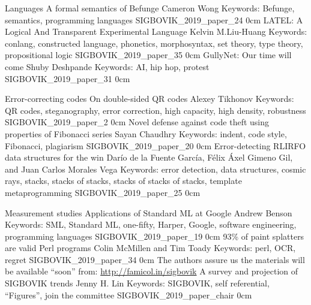 \addtrack
	{}{Languages}
\addpaper
	{A formal semantics of Befunge}
	{Cameron Wong}
	{Keywords: Befunge, semantics, programming languages}
	{SIGBOVIK_2019_paper_24}
	{0cm}
	{}
\addpaper
	{LATEL: A Logical And Transparent Experimental Language}
	{Kelvin M.\@ Liu-Huang}
	{Keywords: conlang, constructed language, phonetics, morphosyntax, set theory, type theory, propositional logic}
	{SIGBOVIK_2019_paper_35}
	{0cm}
	{}
\addpaper
	{GullyNet: Our time will come}
	{Shuby Deshpande}
	{Keywords: AI, hip hop, protest}
	{SIGBOVIK_2019_paper_31}
	{0cm}
	{}

\addtrack
	{}{Error-correcting codes}
\addpaper
	{On double-sided QR codes}
	{Alexey Tikhonov}
	{Keywords: QR codes, steganography, error correction, high capacity, high density, robustness}
	{SIGBOVIK_2019_paper_2}
	{0cm}
	{}
\addpaper
	{Novel defense against code theft using properties of Fibonacci series}
	{Sayan Chaudhry}
	{Keywords: indent, code style, Fibonacci, plagiarism}
	{SIGBOVIK_2019_paper_20}
	{0cm}
	{}
\addpaper
	{Error-detecting RLIRFO data structures for the win}
	{Darío de la Fuente García, Félix Áxel Gimeno Gil, and Juan Carlos Morales Vega}
	{Keywords: error detection, data structures, cosmic rays, stacks, stacks of stacks, stacks of stacks of stacks, template metaprogramming}
	{SIGBOVIK_2019_paper_25}
	{0cm}
	{}

\addtrack
	{}{Measurement studies}
\addpaper
	{Applications of Standard ML at Google}
	{Andrew Benson}
	{Keywords: SML, Standard ML, one-fifty, Harper, Google, software engineering, programming languages}
	{SIGBOVIK_2019_paper_19}
	{0cm}
	{}
\addpaper
	{93\% of paint splatters are valid Perl programs}
	{Colin McMillen and Tim Toady}
	{Keywords: perl, OCR, regret}
	{SIGBOVIK_2019_paper_34}
	{0cm}
	{\vspace{0.15in} {\scriptsize The authors assure us the materials will be available ``soon'' from: \url{http://famicol.in/sigbovik}} }
\addpaper
	{A survey and projection of SIGBOVIK trends}
	{Jenny H. Lin}
	{Keywords: SIGBOVIK, self referential, ``Figures'', join the committee}
	{SIGBOVIK_2019_paper_chair}
	{0cm}
	{}

